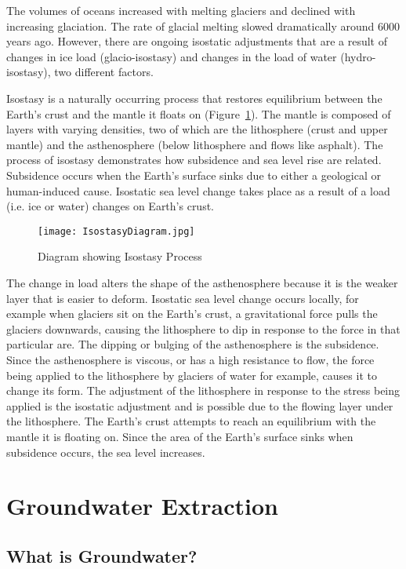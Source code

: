 The volumes of oceans increased with melting glaciers and declined with increasing glaciation. The rate of glacial melting slowed dramatically around 6000 years ago. However, there are ongoing isostatic adjustments that are a result of changes in ice load (glacio-isostasy) and changes in the load of water (hydro-isostasy), two different factors. 
  
Isostasy is a naturally occurring process that restores equilibrium between the Earth's crust and the mantle it floats on (Figure~\ref{fig:isostasy}). The mantle is composed of layers with varying densities, two of which are the lithosphere (crust and upper mantle) and the asthenosphere (below lithosphere and flows like asphalt). The process of isostasy demonstrates how subsidence and sea level rise are related. Subsidence occurs when the Earth's surface sinks due to either a geological or human-induced cause. Isostatic sea level change takes place as a result of a load (i.e. ice or water) changes on Earth's crust.

\begin{figure}
\centering
\texttt{[image: IsostasyDiagram.jpg]}
\caption {Diagram showing Isostasy Process}
\label{fig:isostasy}
\end{figure}

The change in load alters the shape of the asthenosphere because it is the weaker layer that is easier to deform. Isostatic sea level change occurs locally, for example when glaciers sit on the Earth's crust, a gravitational force pulls the glaciers downwards, causing the lithosphere to dip in response to the force in that particular are. The dipping or bulging of the asthenosphere is the subsidence. Since the asthenosphere is viscous, or has a high resistance to flow, the force being applied to the lithosphere by glaciers of water for example, causes it to change its form. The adjustment of the lithosphere in response to the stress being applied is the isostatic adjustment and is possible due to the flowing layer under the lithosphere. The Earth's crust attempts to reach an equilibrium with the mantle it is floating on. Since the area of the Earth's surface sinks when subsidence occurs, the sea level increases. 

\section{Groundwater Extraction}

\subsection{What is Groundwater?}

